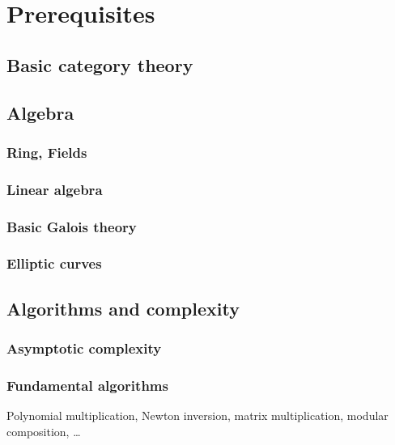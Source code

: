 

\part{Prerequisites}
\chapter{Basic category theory}


\chapter{Algebra}
\section{Ring, Fields}
\section{Linear algebra}
\section{Basic Galois theory}
\section{Elliptic curves}

\chapter{Algorithms and complexity}
\section{Asymptotic complexity}
\section{Fundamental algorithms}
Polynomial multiplication, Newton inversion, matrix multiplication,
modular composition, \ldots




